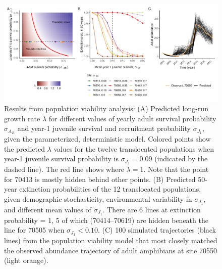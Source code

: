 \documentclass[9pt,twocolumn,twoside,lineno]{pnas-new}
\begin{document}
\begin{figure}

{\centering \includegraphics[width=\textwidth]{figures/pop_viability_figures_for_manuscript.jpg}

}

\caption{\label{fig-viability}Results from population viability
analysis: (A) Predicted long-run growth rate \(\lambda\) for different
values of yearly adult survival probability \(\sigma_{A_R}\) and year-1
juvenile survival and recruitment probability \(\sigma_{J_1}\), given
the parameterized, deterministic model. Colored points show the
predicted \(\lambda\) values for the twelve translocated populations
when year-1 juvenile survival probability is \(\sigma_{J_1} = 0.09\)
(indicated by the dashed line). The red line shows where
\(\lambda = 1\). Note that the point for 70413 is mostly hidden behind
other points. (B) Predicted 50-year extinction probabilities of the 12
translocated populations, given demographic stochasticity, environmental
variability in \(\sigma_{J_1}\), and different mean values of
\(\sigma_{J_1}\). There are 6 lines at extinction probability = 1, 5 of
which (70414--70619) are hidden beneath the line for 70505 when
\(\sigma_{J_1} < 0.10\). (C) 100 simulated trajectories (black lines)
from the population viability model that most closely matched the
observed abundance trajectory of adult amphibians at site 70550 (light
orange).}

\end{figure}

\newpage
\end{document}
